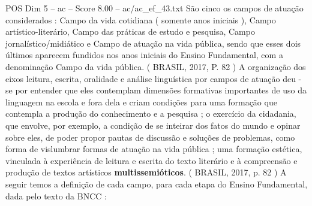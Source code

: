 \begin{textsample}{POS Dim 5 – ac – Score 8.00 – ac/ac\_ef\_43.txt}
São cinco os campos de atuação considerados : Campo da vida cotidiana ( somente anos iniciais ), Campo artístico-literário, Campo das práticas de estudo e pesquisa, Campo jornalístico/midiático e Campo de atuação na vida pública, sendo que esses dois últimos aparecem fundidos nos anos iniciais do Ensino Fundamental, com a denominação Campo da vida pública. ( BRASIL, 2017, P. 82 ) A organização dos eixos leitura, escrita, oralidade e análise linguística por campos de atuação deu -se por entender que eles contemplam dimensões formativas importantes de uso da linguagem na escola e fora dela e criam condições para uma formação que contempla a produção do conhecimento e a pesquisa ; o exercício da cidadania, que envolve, por exemplo, a condição de se inteirar dos fatos do mundo e opinar sobre eles, de poder propor pautas de discussão e soluções de problemas, como forma de vislumbrar formas de atuação na vida pública ; uma formação estética, vinculada à experiência de leitura e escrita do texto literário e à compreensão e produção de textos artísticos \textbf{multissemióticos}. ( BRASIL, 2017, p. 82 ) A seguir temos a definição de cada campo, para cada etapa do Ensino Fundamental, dada pelo texto da BNCC :

\end{textsample}
